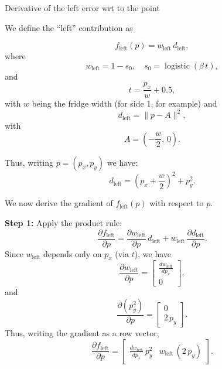 \documentclass[11pt]{article}
\begin{document}
\begin{section}{Derivative of the left error wrt to the point}

    We define the “left” contribution as

    \begin{equation}
        f_{\mathrm{left}}(p) = w_{\mathrm{left}}\, d_{\mathrm{left}},
    \end{equation}
    where
    \begin{equation}
        w_{\mathrm{left}} = 1-s_0, \quad s_0 = \operatorname{logistic}(\beta\, t),
    \end{equation}
    and
    \begin{equation}
        t = \frac{p_x}{w} + 0.5,
    \end{equation}
    with \(w\) being the fridge width (for side 1, for example) and
    \begin{equation}
        d_{\mathrm{left}} = \|p - A\|^2,
    \end{equation}
    with
    \begin{equation}
        A = \left(-\frac{w}{2},\,0\right).
    \end{equation}

    Thus, writing \(p=(p_x,p_y)\) we have:
    \begin{equation}
        d_{\mathrm{left}} = \left(p_x + \frac{w}{2}\right)^2 + p_y^2.
    \end{equation}

    We now derive the gradient of \(f_{\mathrm{left}}(p)\) with respect to \(p\).

    \textbf{Step 1:} Apply the product rule:
    \begin{equation}
        \frac{\partial f_{\mathrm{left}}}{\partial p} = \frac{\partial w_{\mathrm{left}}}{\partial p}\, d_{\mathrm{left}} + w_{\mathrm{left}}\, \frac{\partial d_{\mathrm{left}}}{\partial p}.
    \end{equation}
    Since \(w_{\mathrm{left}}\) depends only on \(p_x\) (via \(t\)), we have
    \begin{equation}
        \frac{\partial w_{\mathrm{left}}}{\partial p} =
        \begin{bmatrix}
            \frac{d w_{\mathrm{left}}}{d p_x} \\
            0
        \end{bmatrix},
    \end{equation}
    and
    \begin{equation}
        \frac{\partial (p_y^2)}{\partial p} =
        \begin{bmatrix}
            0 \\
            2\, p_y
        \end{bmatrix}.
    \end{equation}
    Thus, writing the gradient as a row vector,
    \begin{equation}
        \frac{\partial f_{\mathrm{left}}}{\partial p} =
        \begin{bmatrix}
            \frac{d w_{\mathrm{left}}}{d p_x}\, p_y^2 & w_{\mathrm{left}}\,(2\,p_y)
        \end{bmatrix}.
    \end{equation}


\end{section}
\end{document}
